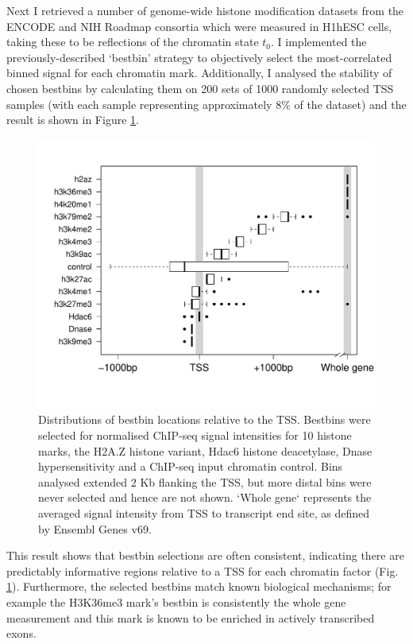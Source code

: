 \documentclass[a4paper,10pt,oneside]{book}
\begin{document}
Next I retrieved a number of genome-wide histone modification datasets
from the ENCODE and
NIH Roadmap consortia which were measured in H1hESC cells, taking these to be
reflections of the chromatin state $t_0$. I implemented the
previously-described `bestbin' strategy\cite{Dong2012} to objectively
select the most-correlated binned signal for each chromatin
mark. Additionally, I analysed the stability of chosen bestbins by
calculating them on 200 sets of 1000 randomly selected TSS samples (with each sample
representing approximately $8\%$ of the dataset) and the result is
shown in Figure \ref{fig:bestbin}. \\

\begin{figure}[H]
\begin{center} 
\includegraphics[width=.9\textwidth]{r1_fig/bestbinSummary.pdf}
\captionsetup{width=.9\textwidth}
\caption{Distributions of bestbin locations relative to the
  TSS. Bestbins were selected for normalised ChIP-seq
  signal intensities for 10 histone marks, the
  H2A.Z histone variant, Hdac6 histone deacetylase, Dnase
  hypersensitivity and a ChIP-seq input chromatin control. Bins analysed
  extended 2 Kb flanking the TSS, but more distal bins were
  never selected and hence are not shown. `Whole gene` represents the
  averaged signal intensity from TSS to transcript end site, as
  defined by Ensembl Genes v69.
}\label{fig:bestbin}
\end{center}
\end{figure} 

This result shows that bestbin selections are often consistent, indicating there are predictably informative regions
relative to a TSS for each chromatin factor (Fig. \ref{fig:bestbin}). Furthermore, the selected
bestbins match known biological mechanisms; for example the H3K36me3
mark's bestbin is consistently the whole gene measurement and this
mark is known to be enriched in actively transcribed
exons.\cite{Tippmann2012, Kolasinska-Zwierz2009, Schaft2003} \\
\end{document}

